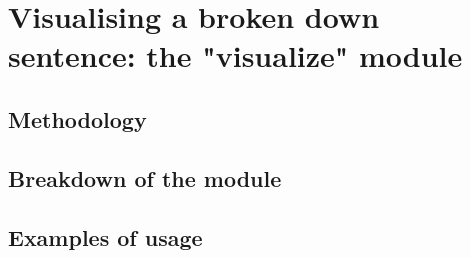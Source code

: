 \chapter{Visualising a broken down sentence: the "visualize" module}
\label{chap:visualize-module}


\section{Methodology}

\section{Breakdown of the module}

\section{Examples of usage}